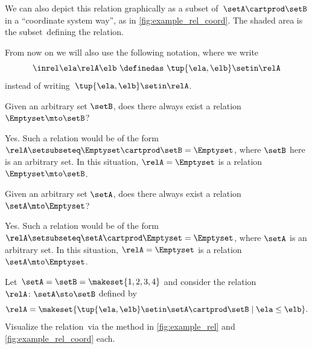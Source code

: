 \begin{marginfigure}
    \centering
    \caption{Relations visualized in ``coordinate systems''.}
    \label{fig:example_rel_coord}
\end{marginfigure}

We can also depict this relation graphically as a subset of~$\setA \cartprod \setB$ in a ``coordinate system way'', as in \cref{fig:example_rel_coord}.
The shaded area is the subset~\relA defining the relation.

\begin{remark}
    From now on we will also use the following notation, where we write
    \begin{equation}
        \inrel \ela \relA \elb \ \definedas\  \tup{\ela,\elb}\setin \relA
    \end{equation}
    instead of writing~$\tup{\ela,\elb}\setin \relA$.
\end{remark}

\begin{exercise}
    Given an arbitrary set $\setB$, does there always exist a relation $\Emptyset \mto \setB$?
\end{exercise}

\begin{solution}
    Yes.
    Such a relation would be of the form~$\relA \setsubseteq \Emptyset \cartprod \setB = \Emptyset$, where $\setB$ here is an arbitrary set.
    In this situation, $\relA=\Emptyset$ is a relation $\Emptyset \mto \setB$.
\end{solution}

\begin{exercise}
    Given an arbitrary set $\setA$, does there always exist a relation $\setA \mto \Emptyset$?
\end{exercise}

\begin{solution}
    Yes.
    Such a relation would be of the form~$\relA \setsubseteq \setA \cartprod \Emptyset = \Emptyset$, where $\setA$ is an arbitrary set.
    In this situation, $\relA=\Emptyset$ is a relation $\setA \mto \Emptyset$.
\end{solution}

\begin{gradedexercise}
    \label{ex:visualize-leq-relation}
    Let~$\setA = \setB = \makeset{1, 2, 3, 4}$ and consider the relation~$\relA \colon \setA \sto \setB$ defined by
    \begin{equation}
        \relA = \makeset{ \tup{\ela,\elb} \setin \setA \cartprod \setB \mid \ela \leq \elb }.
    \end{equation}
    Visualize the relation~\relA via the method in \cref{fig:example_rel} and \cref{fig:example_rel_coord} each.
\end{gradedexercise}

